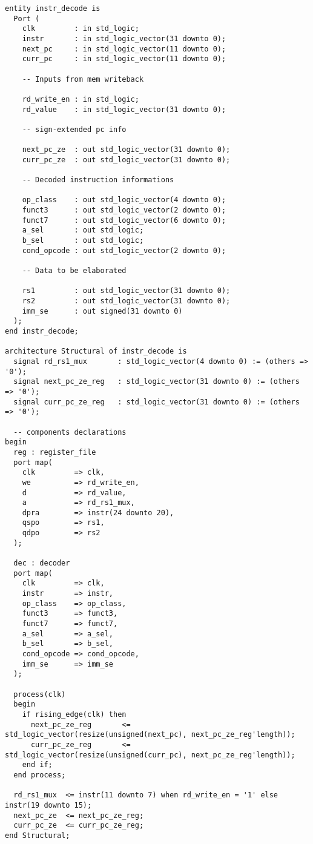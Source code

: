 \begin{verbatim}
entity instr_decode is
  Port (
    clk         : in std_logic;
    instr       : in std_logic_vector(31 downto 0);
    next_pc     : in std_logic_vector(11 downto 0);
    curr_pc     : in std_logic_vector(11 downto 0);
    
    -- Inputs from mem writeback
    
    rd_write_en : in std_logic;
    rd_value    : in std_logic_vector(31 downto 0);
    
    -- sign-extended pc info
    
    next_pc_ze  : out std_logic_vector(31 downto 0);
    curr_pc_ze  : out std_logic_vector(31 downto 0);
    
    -- Decoded instruction informations
    
    op_class    : out std_logic_vector(4 downto 0);
    funct3      : out std_logic_vector(2 downto 0);
    funct7      : out std_logic_vector(6 downto 0);
    a_sel       : out std_logic;
    b_sel       : out std_logic;
    cond_opcode : out std_logic_vector(2 downto 0);
    
    -- Data to be elaborated
    
    rs1         : out std_logic_vector(31 downto 0);
    rs2         : out std_logic_vector(31 downto 0);
    imm_se      : out signed(31 downto 0)
  );
end instr_decode;

architecture Structural of instr_decode is
  signal rd_rs1_mux       : std_logic_vector(4 downto 0) := (others => '0');
  signal next_pc_ze_reg   : std_logic_vector(31 downto 0) := (others => '0');
  signal curr_pc_ze_reg   : std_logic_vector(31 downto 0) := (others => '0');
      
  -- components declarations
begin
  reg : register_file
  port map(
    clk         => clk,
    we          => rd_write_en,
    d           => rd_value,
    a           => rd_rs1_mux,
    dpra        => instr(24 downto 20),
    qspo        => rs1,
    qdpo        => rs2
  );
  
  dec : decoder
  port map(
    clk         => clk,
    instr       => instr,
    op_class    => op_class,
    funct3      => funct3,
    funct7      => funct7,
    a_sel       => a_sel,
    b_sel       => b_sel,
    cond_opcode => cond_opcode,
    imm_se      => imm_se
  );
    
  process(clk)
  begin
    if rising_edge(clk) then
      next_pc_ze_reg       <= std_logic_vector(resize(unsigned(next_pc), next_pc_ze_reg'length));
      curr_pc_ze_reg       <= std_logic_vector(resize(unsigned(curr_pc), next_pc_ze_reg'length));
    end if;
  end process;
  
  rd_rs1_mux  <= instr(11 downto 7) when rd_write_en = '1' else instr(19 downto 15);
  next_pc_ze  <= next_pc_ze_reg;
  curr_pc_ze  <= curr_pc_ze_reg;
end Structural;
\end{verbatim}


